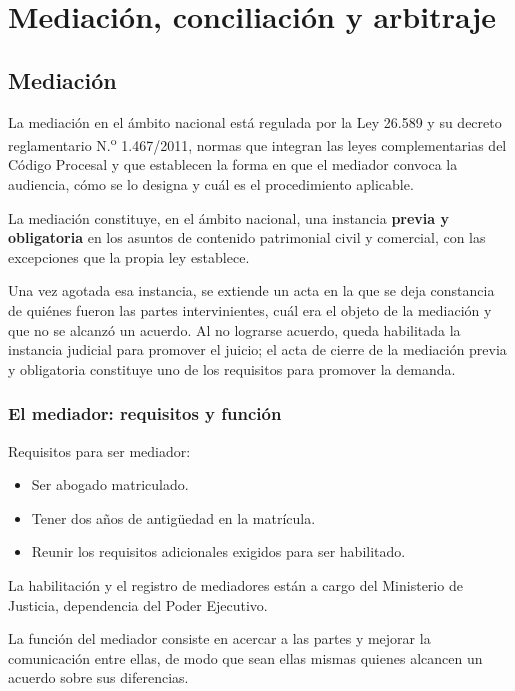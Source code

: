 \documentclass[12pt,oneside]{book}
\begin{document}
\chapter{Mediación, conciliación y arbitraje}

\section{Mediación}

La mediación en el ámbito nacional está regulada por la Ley 26.589 y su decreto reglamentario N.\textsuperscript{o} 1.467/2011, normas que integran las leyes complementarias del Código Procesal y que establecen la forma en que el mediador convoca la audiencia, cómo se lo designa y cuál es el procedimiento aplicable.

\begin{important}
La mediación constituye, en el ámbito nacional, una instancia \textbf{previa y obligatoria} en los asuntos de contenido patrimonial civil y comercial, con las excepciones que la propia ley establece.
\end{important}

Una vez agotada esa instancia, se extiende un acta en la que se deja constancia de quiénes fueron las partes intervinientes, cuál era el objeto de la mediación y que no se alcanzó un acuerdo. Al no lograrse acuerdo, queda habilitada la instancia judicial para promover el juicio; el acta de cierre de la mediación previa y obligatoria constituye uno de los requisitos para promover la demanda.

\subsection{El mediador: requisitos y función}

Requisitos para ser mediador:

\begin{itemize}
    \item Ser abogado matriculado.
    \item Tener dos años de antigüedad en la matrícula.
    \item Reunir los requisitos adicionales exigidos para ser habilitado.
\end{itemize}

La habilitación y el registro de mediadores están a cargo del Ministerio de Justicia, dependencia del Poder Ejecutivo.

La función del mediador consiste en acercar a las partes y mejorar la comunicación entre ellas, de modo que sean ellas mismas quienes alcancen un acuerdo sobre sus diferencias.
\end{document}
